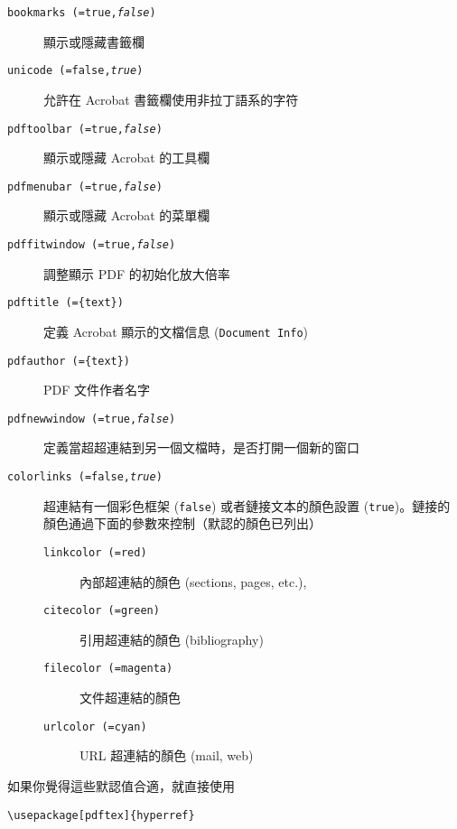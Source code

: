\begin{flushleft}
\begin{description}
  \item [\texttt{bookmarks (=true,\textit{false})}] 顯示或隱藏書籤欄
  \item [\texttt{unicode (=false,\textit{true})}] 允許在 Acrobat 書籤欄使用非拉丁語系的字符
  \item [\texttt{pdftoolbar (=true,\textit{false})}] 顯示或隱藏 Acrobat 的工具欄
  \item [\texttt{pdfmenubar (=true,\textit{false})}] 顯示或隱藏 Acrobat 的菜單欄
  \item [\texttt{pdffitwindow (=true,\textit{false})}] 調整顯示 PDF 的初始化放大倍率
  \item [\texttt{pdftitle (=\{text\})}] 定義 Acrobat 顯示的文檔信息 (\texttt{Document
  Info})
  \item [\texttt{pdfauthor (=\{text\})}] PDF 文件作者名字
  \item [\texttt{pdfnewwindow (=true,\textit{false})}] 定義當超超連結到另一個文檔時，是否打開一個新的窗口
  \item [\texttt{colorlinks (=false,\textit{true})}]
  超連結有一個彩色框架 (\texttt{false})   或者鏈接文本的顏色設置 (\texttt{true})。鏈接的顏色通過下面的參數來控制（默認的顏色已列出）
    \begin{description}
    \item [\texttt{linkcolor (=red)}]內部超連結的顏色 (sections, pages, etc.),
    \item [\texttt{citecolor (=green)}]引用超連結的顏色 (bibliography)
    \item [\texttt{filecolor (=magenta)}] 文件超連結的顏色
    \item [\texttt{urlcolor (=cyan)}] URL 超連結的顏色 (mail, web)
    \end{description}
\end{description}
\end{flushleft}


如果你覺得這些默認值合適，就直接使用
\begin{code}
\begin{verbatim}
\usepackage[pdftex]{hyperref}
\end{verbatim}
\end{code}

